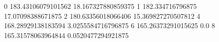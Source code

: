 0 183.43106079101562 18.167327880859375
1 182.334716796875 17.07098388671875
2 180.63356018066406 15.369827270507812
4 168.28929138183594 3.0255584716796875
6 165.26373291015625 0.0
8 165.31578063964844 0.0520477294921875
